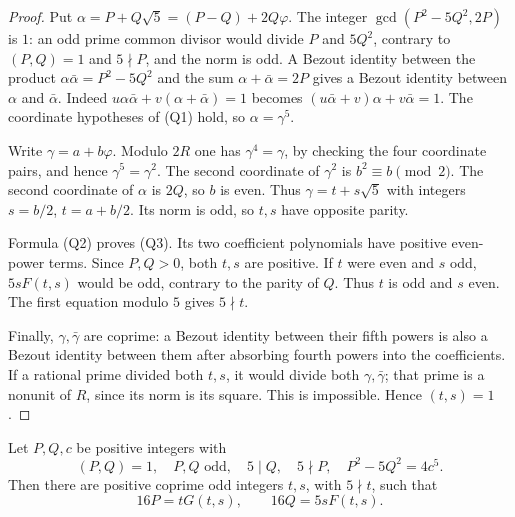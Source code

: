 \begin{proof}
Put \(\alpha=P+Q\sqrt5=(P-Q)+2Q\varphi\).
The integer \(\gcd(P^2-5Q^2,2P)\) is \(1\):
an odd prime common divisor would divide \(P\) and \(5Q^2\),
contrary to \((P,Q)=1\) and \(5\nmid P\), and the norm is odd.
A Bezout identity between the product
\(\alpha\bar\alpha=P^2-5Q^2\) and the sum
\(\alpha+\bar\alpha=2P\) gives a Bezout identity between
\(\alpha\) and \(\bar\alpha\).  Indeed
\(u\alpha\bar\alpha+v(\alpha+\bar\alpha)=1\) becomes
\((u\bar\alpha+v)\alpha+v\bar\alpha=1\).
The coordinate hypotheses of (Q1) hold, so \(\alpha=\gamma^5\).

Write \(\gamma=a+b\varphi\).  Modulo \(2R\) one has
\(\gamma^4=\gamma\), by checking the four coordinate pairs, and hence
\(\gamma^5=\gamma^2\).  The second coordinate of
\(\gamma^2\) is \(b^2\equiv b\pmod2\).
The second coordinate of \(\alpha\) is \(2Q\), so \(b\) is even.
Thus \(\gamma=t+s\sqrt5\) with integers
\(s=b/2\), \(t=a+b/2\).
Its norm is odd, so \(t,s\) have opposite parity.

Formula (Q2) proves (Q3).  Its two coefficient polynomials have positive
even-power terms.  Since \(P,Q>0\), both \(t,s\) are positive.
If \(t\) were even and \(s\) odd, \(5sF(t,s)\) would be odd,
contrary to the parity of \(Q\).  Thus \(t\) is odd and \(s\) even.
The first equation modulo \(5\) gives \(5\nmid t\).

Finally, \(\gamma,\bar\gamma\) are coprime: a Bezout identity between
their fifth powers is also a Bezout identity between them after
absorbing fourth powers into the coefficients.  If a rational prime
divided both \(t,s\), it would divide both \(\gamma,\bar\gamma\);
that prime is a nonunit of \(R\), since its norm is its square.
This is impossible.  Hence \((t,s)=1\).
\end{proof}

\begin{lemma}\label{lem:quintic-half}
Let \(P,Q,c\) be positive integers with
\[
 (P,Q)=1,\quad P,Q\text{ odd},\quad
 5\mid Q,\quad5\nmid P,\quad P^2-5Q^2=4c^5.
\]
Then there are positive coprime odd integers \(t,s\), with \(5\nmid t\),
such that
\[
 16P=tG(t,s),\qquad16Q=5sF(t,s).
 \tag{Q4}\label{eq:quintic-half}
\]
\end{lemma}

